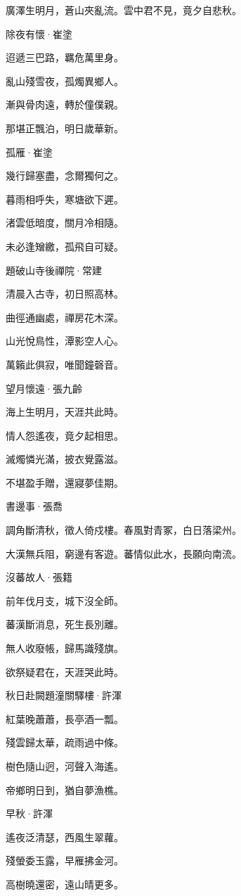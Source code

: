 \documentclass[12pt,a4paper]{ctexbook}
\begin{document}
廣澤生明月，蒼山夾亂流。雲中君不見，竟夕自悲秋。\par
除夜有懷·崔塗\par
迢遞三巴路，羈危萬里身。\par
亂山殘雪夜，孤燭異鄉人。\par
漸與骨肉遠，轉於僮僕親。\par
那堪正飄泊，明日歲華新。\par
孤雁·崔塗\par
幾行歸塞盡，念爾獨何之。\par
暮雨相呼失，寒塘欲下遲。\par
渚雲低暗度，關月冷相隨。\par
未必逢矰繳，孤飛自可疑。\par
題破山寺後禪院·常建\par
清晨入古寺，初日照高林。\par
曲徑通幽處，禪房花木深。\par
山光悅鳥性，潭影空人心。\par
萬籟此俱寂，唯聞鐘磬音。\par
望月懷遠·張九齡\par
海上生明月，天涯共此時。\par
情人怨遙夜，竟夕起相思。\par
滅燭憐光滿，披衣覺露滋。\par
不堪盈手贈，還寢夢佳期。\par
書邊事·張喬\par
調角斷清秋，徵人倚戍樓。春風對青冢，白日落梁州。\par
大漢無兵阻，窮邊有客遊。蕃情似此水，長願向南流。\par
沒蕃故人·張籍\par
前年伐月支，城下沒全師。\par
蕃漢斷消息，死生長別離。\par
無人收廢帳，歸馬識殘旗。\par
欲祭疑君在，天涯哭此時。\par
秋日赴闕題潼關驛樓·許渾\par
紅葉晚蕭蕭，長亭酒一瓢。\par
殘雲歸太華，疏雨過中條。\par
樹色隨山迥，河聲入海遙。\par
帝鄉明日到，猶自夢漁樵。\par
早秋·許渾\par
遙夜泛清瑟，西風生翠蘿。\par
殘螢委玉露，早雁拂金河。\par
高樹曉還密，遠山晴更多。\par
\end{document}
